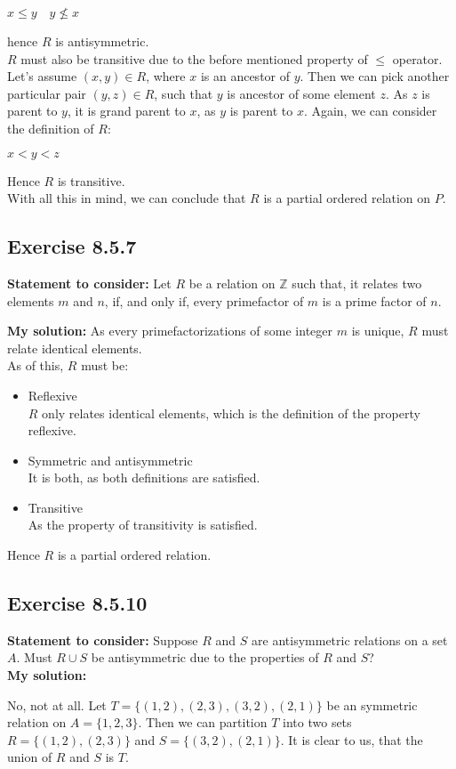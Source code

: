 \documentclass{report}
\newcommand{\cent}[1]{\begin{center}#1\end{center}}
\newcommand{\doubleZ}{\mathbb{Z}}
\newcommand{\In}{\! \in \!}
\newcommand{\assignmentDescription}{\textbf{Statement to consider: }}
\newcommand{\solution}{\textbf{My solution: }}
\newcommand{\QED}{\boxed{}}
\newcommand{\Exercise}[1]{\subsection{Exercise #1}}
\begin{document}
	\cent{$ x \leq y \quad y \not \leq x $}
	
	hence $R$ is antisymmetric.\\
	
	$R$ must also be transitive due to the before mentioned property of $\leq$ operator. Let's assume $(x,y) \In R$, where $x$ is an ancestor of $y$. Then we can pick another particular pair $(y,z)\In R$, such that $y$ is ancestor of some element $z$. As $z$ is parent to $y$, it is grand parent to $x$, as $y$ is parent to $x$. Again, we can consider the definition of $R$:
	
	\cent{$x < y < z$}
	
	Hence $R$ is transitive.\\
	
	With all this in mind, we can conclude that $R$ is a partial ordered relation on $P$.\\
	\QED
	
	\Exercise{8.5.7}
	\assignmentDescription
	Let $R$ be a relation on $\doubleZ$ such that, it relates two elements $m$ and $n$, if, and only if, every primefactor of $m$ is a prime factor of $n$.
	
	\solution
	As every primefactorizations of some integer $m$ is unique, $R$ must relate identical elements.\\
	
	As of this, $R$ must be:
	\begin{itemize}
		\item Reflexive\\
		$R$ only relates identical elements, which is the definition of the property reflexive.
		\item Symmetric and antisymmetric\\
		It is both, as both definitions are satisfied.
		\item Transitive\\
		As the property of transitivity is satisfied.
	\end{itemize}
	Hence $R$ is a partial ordered relation.\\
	\QED
 
	\Exercise{8.5.10}
	
	\assignmentDescription
	Suppose $R$ and $S$ are antisymmetric relations on a set $A$. Must $R \cup S$ be antisymmetric due to the properties of $R$ and $S$?\\
	
	\solution
	
	No, not at all. Let $T = \{(1,2),(2,3),(3,2),(2,1)\}$ be an symmetric relation on $A = \{1,2,3\}$. Then we can partition $T$ into two sets $R = \{(1,2),(2,3)\}$ and $S = \{(3,2),(2,1)\}$. It is clear to us, that the union of $R$ and $S$ is $T$.\\
	
\end{document}
